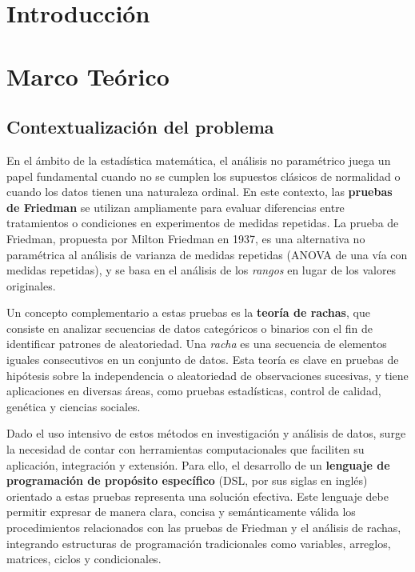 \documentclass{article}
\begin{document}

\section{Introducción}\label{sec:intr}


\section{Marco Teórico}\label{sec:marc}


\subsection{Contextualización del problema}

En el ámbito de la estadística matemática, el análisis no paramétrico juega un papel fundamental cuando no se cumplen los supuestos clásicos de normalidad o cuando los datos tienen una naturaleza ordinal. En este contexto, las \textbf{pruebas de Friedman} se utilizan ampliamente para evaluar diferencias entre tratamientos o condiciones en experimentos de medidas repetidas. La prueba de Friedman, propuesta por Milton Friedman en 1937, es una alternativa no paramétrica al análisis de varianza de medidas repetidas (ANOVA de una vía con medidas repetidas), y se basa en el análisis de los \emph{rangos} en lugar de los valores originales.

Un concepto complementario a estas pruebas es la \textbf{teoría de rachas}, que consiste en analizar secuencias de datos categóricos o binarios con el fin de identificar patrones de aleatoriedad. Una \emph{racha} es una secuencia de elementos iguales consecutivos en un conjunto de datos. Esta teoría es clave en pruebas de hipótesis sobre la independencia o aleatoriedad de observaciones sucesivas, y tiene aplicaciones en diversas áreas, como pruebas estadísticas, control de calidad, genética y ciencias sociales.

Dado el uso intensivo de estos métodos en investigación y análisis de datos, surge la necesidad de contar con herramientas computacionales que faciliten su aplicación, integración y extensión. Para ello, el desarrollo de un \textbf{lenguaje de programación de propósito específico} (DSL, por sus siglas en inglés) orientado a estas pruebas representa una solución efectiva. Este lenguaje debe permitir expresar de manera clara, concisa y semánticamente válida los procedimientos relacionados con las pruebas de Friedman y el análisis de rachas, integrando estructuras de programación tradicionales como variables, arreglos, matrices, ciclos y condicionales.
\end{document}
